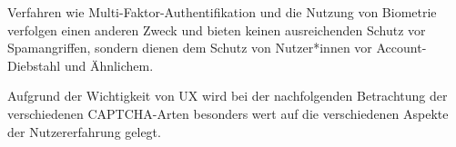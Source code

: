 Verfahren wie Multi-Faktor-Authentifikation und die Nutzung von Biometrie verfolgen einen anderen Zweck 
und bieten keinen ausreichenden Schutz vor Spamangriffen, sondern dienen dem Schutz von Nutzer*innen vor Account-Diebstahl und Ähnlichem.

Aufgrund der Wichtigkeit von UX wird bei der nachfolgenden Betrachtung der verschiedenen CAPTCHA-Arten 
besonders wert auf die verschiedenen Aspekte der Nutzererfahrung gelegt.